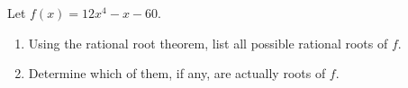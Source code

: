 Let $f(x)=12x^4-x-60$.
\begin{enumerate}
\item[(a)] Using the rational root theorem, list all possible rational roots of $f$.
\item[(b)] Determine which of them, if any, are actually roots of $f$.
\end{enumerate}
